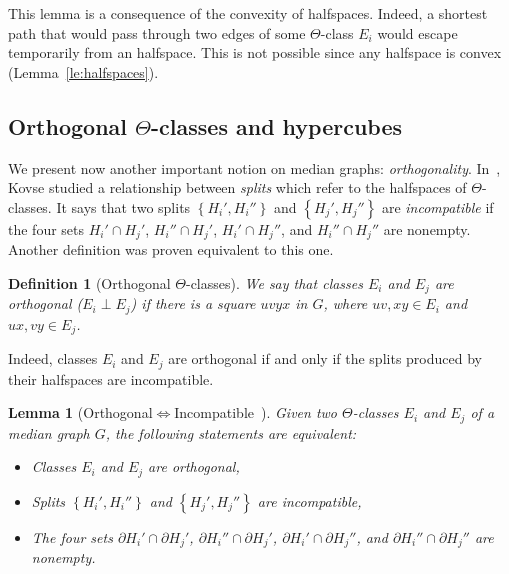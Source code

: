 \documentclass[11pt,letterpaper]{article}
\newtheorem{lemma}{Lemma}
\newtheorem{definition}{Definition}
\newcommand{\set}[1]{\left\{ #1 \right\}}
\begin{document}
This lemma is a consequence of the convexity of halfspaces. Indeed, a shortest path that would pass through two edges of some $\Theta$-class $E_i$ would escape temporarily from an halfspace. This is not possible since any halfspace is convex (Lemma~\ref{le:halfspaces}).


\subsection{Orthogonal $\Theta$-classes and hypercubes}

We present now another important notion on median graphs: \textit{orthogonality}. In~\cite{Ko09}, Kovse studied a relationship between \textit{splits} which refer to the halfspaces of $\Theta$-classes. It says that two splits $\set{H_i',H_i''}$ and $\set{H_j',H_j''}$ are \textit{incompatible} if the four sets $H_i' \cap H_j'$, $H_i'' \cap H_j'$, $H_i' \cap H_j''$, and $H_i'' \cap H_j''$ are nonempty. Another definition was proven equivalent to this one.

\begin{definition}[Orthogonal $\Theta$-classes]
We say that classes $E_i$ and $E_j$ are {\em orthogonal} ($E_i \perp E_j$) if there is a square $uvyx$ in $G$, where $uv,xy \in E_i$ and $ux,vy \in E_j$.
\end{definition}

Indeed, classes $E_i$ and $E_j$ are orthogonal if and only if the splits produced by their halfspaces are incompatible.

\begin{lemma}[Orthogonal$\Leftrightarrow$Incompatible~\cite{BeHa21}] Given two $\Theta$-classes $E_i$ and $E_j$ of a median graph $G$, the following statements are equivalent:
\begin{itemize}
    \item Classes $E_i$ and $E_j$ are orthogonal,
    \item Splits $\set{H_i',H_i''}$ and $\set{H_j',H_j''}$ are incompatible,
    \item The four sets $\partial H_i' \cap \partial H_j'$, $\partial H_i'' \cap \partial H_j'$, $\partial H_i' \cap \partial H_j''$, and $\partial H_i'' \cap \partial H_j''$ are nonempty.
\end{itemize}
\label{le:perp_incomp}
\end{lemma}
\end{document}
